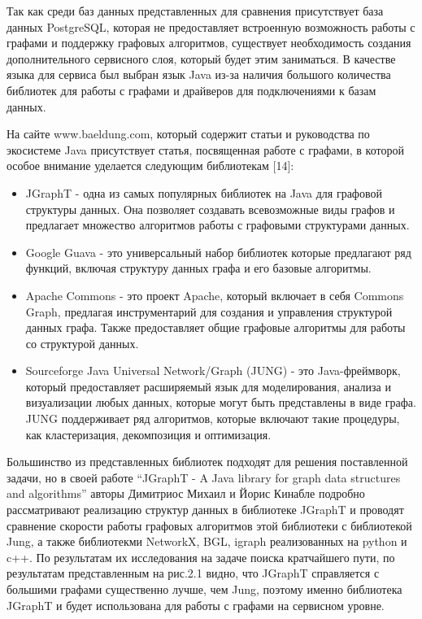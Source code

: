 Так как среди баз данных представленных для сравнения присутствует база данных PostgreSQL, которая не предоставляет встроенную возможность
работы с графами и поддержку графовых алгоритмов, существует необходимость создания дополнительного сервисного слоя, который будет этим
заниматься. В качестве языка для сервиса был выбран язык Java из-за наличия большого количества библиотек для работы с графами и драйверов
для подключениями к базам данных.

На сайте www.baeldung.com, который содержит статьи и руководства по экосистеме Java присутствует статья, посвященная работе с графами, в
которой особое внимание уделается следующим библиотекам [14]:

\begin{itemize}
    \item JGraphT - одна из самых популярных библиотек на Java для графовой структуры данных. Она позволяет создавать всевозможные виды графов и предлагает множество алгоритмов работы с графовыми структурами данных.
    \item Google Guava - это универсальный набор библиотек которые предлагают ряд функций, включая структуру данных графа и его базовые алгоритмы.
    \item Apache Commons - это проект Apache, который включает в себя Commons Graph, предлагая инструментарий для создания и управления структурой данных графа. Также предоставляет общие графовые алгоритмы для работы со структурой данных.
    \item Sourceforge Java Universal Network/Graph (JUNG) - это Java-фреймворк, который предоставляет расширяемый язык для моделирования, анализа и визуализации любых данных, которые могут быть представлены в виде графа. JUNG поддерживает ряд алгоритмов, которые включают такие процедуры, как кластеризация, декомпозиция и оптимизация.
\end{itemize}

Большинство из представленных библиотек подходят для решения поставленной задачи, но в своей работе “JGraphT - A Java library for graph
data structures and algorithms” авторы Димитриос Михаил и Йорис Кинабле подробно рассматривают реализацию структур данных в библиотеке
JGraphT и проводят сравнение скорости работы графовых алгоритмов этой библиотеки с библиотекой Jung, а также библиотекми NetworkX, BGL,
igraph реализованных на python и c++. По результатам их исследования на задаче поиска кратчайшего пути, по результатам представленным
на рис.2.1 видно, что JGraphT справляется с большими графами существенно лучше, чем Jung, поэтому именно библиотека JGraphT и будет
использована для работы с графами на сервисном уровне.


